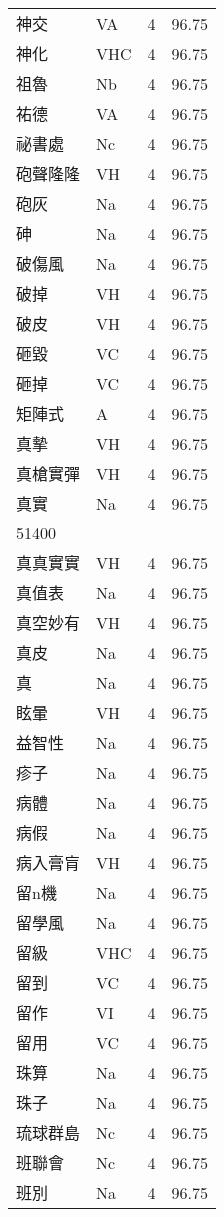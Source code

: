 \documentclass[twocolumn]{book}
\begin{document}
\begin{supertabular}{llrr}
神交 & VA & 4 &  96.75\\
神化 & VHC & 4 &  96.75\\
祖魯 & Nb & 4 &  96.75\\
祐德 & VA & 4 &  96.75\\
祕書處 & Nc & 4 &  96.75\\
砲聲隆隆 & VH & 4 &  96.75\\
砲灰 & Na & 4 &  96.75\\
砷 & Na & 4 &  96.75\\
破傷風 & Na & 4 &  96.75\\
破掉 & VH & 4 &  96.75\\
破皮 & VH & 4 &  96.75\\
砸毀 & VC & 4 &  96.75\\
砸掉 & VC & 4 &  96.75\\
矩陣式 & A & 4 &  96.75\\
真摰 & VH & 4 &  96.75\\
真槍實彈 & VH & 4 &  96.75\\
真實 & Na & 4 &  96.75\\
51400\\
真真實實 & VH & 4 &  96.75\\
真值表 & Na & 4 &  96.75\\
真空妙有 & VH & 4 &  96.75\\
真皮 & Na & 4 &  96.75\\
真 & Na & 4 &  96.75\\
眩暈 & VH & 4 &  96.75\\
益智性 & Na & 4 &  96.75\\
疹子 & Na & 4 &  96.75\\
病體 & Na & 4 &  96.75\\
病假 & Na & 4 &  96.75\\
病入膏肓 & VH & 4 &  96.75\\
留n機 & Na & 4 &  96.75\\
留學風 & Na & 4 &  96.75\\
留級 & VHC & 4 &  96.75\\
留到 & VC & 4 &  96.75\\
留作 & VI & 4 &  96.75\\
留用 & VC & 4 &  96.75\\
珠算 & Na & 4 &  96.75\\
珠子 & Na & 4 &  96.75\\
琉球群島 & Nc & 4 &  96.75\\
班聯會 & Nc & 4 &  96.75\\
班別 & Na & 4 &  96.75\\

\end{supertabular}
\end{document}
